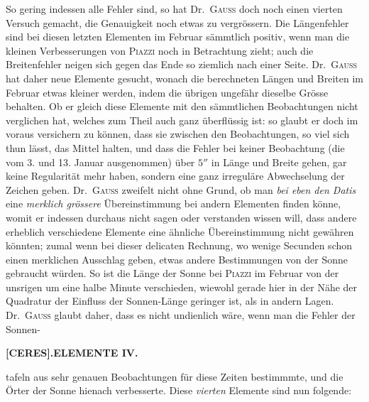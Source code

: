 So gering indessen alle Fehler sind, so hat Dr.\ \textsc{Gauss} doch noch einen vierten Versuch gemacht, die Genauigkeit noch etwas zu vergrössern. Die Längenfehler sind bei diesen letzten Elementen im Februar sämmtlich positiv, wenn man die kleinen Verbesserungen von \textsc{Piazzi} noch in Betrachtung zieht; auch die Breitenfehler neigen sich gegen das Ende so ziemlich nach einer Seite. Dr.\ \textsc{Gauss} hat daher neue Elemente gesucht, wonach die berechneten Längen und Breiten im Februar etwas kleiner werden, indem die übrigen ungefähr dieselbe Grösse behalten. Ob er gleich diese Elemente mit den sämmtlichen Beobachtungen nicht verglichen hat, welches zum Theil auch ganz überflüssig ist: so glaubt er doch im voraus versichern zu können, dass sie zwischen den Beobachtungen, so viel sich thun lässt, das Mittel halten, und dass die Fehler bei keiner Beobachtung (die vom 3. und 13. Januar ausgenommen) über $5''$ in Länge und Breite gehen, gar keine Regularität mehr haben, sondern eine ganz irreguläre Abwechselung der Zeichen geben. Dr.\ \textsc{Gauss} zweifelt nicht ohne Grund, ob man \textit{bei eben den Datis} eine \textit{merklich grössere} Übereinstimmung bei andern Elementen finden könne, womit er indessen durchaus nicht sagen oder verstanden wissen will, dass andere erheblich verschiedene Elemente eine ähnliche Übereinstimmung nicht gewähren könnten; zumal wenn bei dieser delicaten Rechnung, wo wenige Secunden schon einen merklichen Ausschlag geben, etwas andere Bestimmungen von der Sonne gebraucht würden. So ist die Länge der Sonne bei \textsc{Piazzi} im Februar von der unsrigen um eine halbe Minute verschieden, wiewohl gerade hier in der Nähe der Quadratur der Einfluss der Sonnen-Länge geringer ist, als in andern Lagen. Dr.\ \textsc{Gauss} glaubt daher, dass es nicht undienlich wäre, wenn man die Fehler der Sonnen-
\par\clearpage
\normalsize
\thispagestyle{empty}
\noindent{}%
\makebox[12mm][l]{}%
\parbox[t]{\dimexpr\linewidth-24mm\relax}{\centering\footnotesize\bfseries [CERES].\enspace ELEMENTE IV.\par}%
\par\nobreak\medskip
\noindent tafeln aus sehr genauen Beobachtungen für diese Zeiten bestimmmte, und die Örter der Sonne hienach verbesserte. Diese \textit{vierten} Elemente sind nun folgende:
